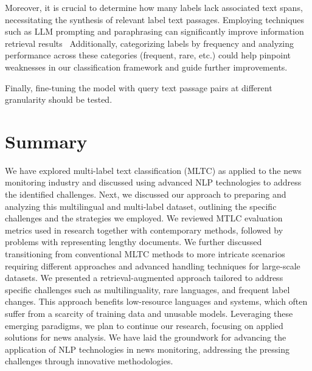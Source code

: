 Moreover, it is crucial to determine how many labels lack associated text spans, necessitating the synthesis of relevant label text passages. Employing techniques such as LLM prompting and paraphrasing can significantly improve information retrieval results~\parencite{wang2024improvingtextembeddingslarge}
Additionally, categorizing labels by frequency and analyzing performance across these categories (frequent, rare, etc.) could help pinpoint weaknesses in our classification framework and guide further improvements.

Finally, fine-tuning the model with query text passage pairs at different granularity should be tested.

\section{Summary}

We have explored multi-label text classification (MLTC) as applied to the news monitoring industry and discussed using advanced NLP technologies to address the identified challenges. 
Next, we discussed our approach to preparing and analyzing this multilingual and multi-label dataset, outlining the specific challenges and the strategies we employed.
We reviewed MTLC evaluation metrics used in research together with contemporary methods, followed by problems with representing lengthy documents. 
We further discussed transitioning from conventional MLTC methods to more intricate scenarios requiring different approaches and advanced handling techniques for large-scale datasets.
We presented a retrieval-augmented approach tailored to address specific challenges such as multilinguality, rare languages, and frequent label changes. 
This approach benefits low-resource languages and systems, which often suffer from a scarcity of training data and unusable models.
Leveraging these emerging paradigms, we plan to continue our research, focusing on applied solutions for news analysis.
We have laid the groundwork for advancing the application of NLP technologies in news monitoring, addressing the pressing challenges through innovative methodologies.